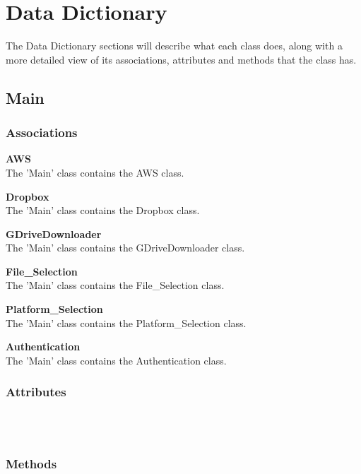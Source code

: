 \section{Data Dictionary}
The Data Dictionary sections will describe what each class does, along with a more detailed view of its
associations, attributes and methods that the class has.

\subsection{Main}

\subsubsection{Associations}
\textbf{AWS} \\
The 'Main' class contains the AWS class.

\textbf{Dropbox} \\
The 'Main' class contains the Dropbox class.

\textbf{GDriveDownloader} \\
The 'Main' class contains the GDriveDownloader class.

\textbf{File\_Selection} \\
The 'Main' class contains the File\_Selection class.

\textbf{Platform\_Selection} \\
The 'Main' class contains the Platform\_Selection class.

\textbf{Authentication} \\
The 'Main' class contains the Authentication class.

\subsubsection{Attributes}
\textbf{} \\

\textbf{} \\

\subsubsection{Methods}
\textbf{} \\
  
\textbf{} \\

